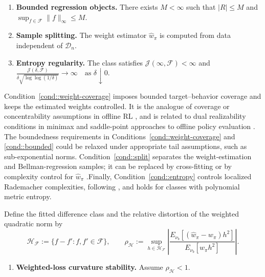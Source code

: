 \documentclass{article}
\theoremstyle{plain}
\theoremstyle{definition}
\theoremstyle{remark}
\begin{document}
\begin{enumerate}[label=\textbf{C\arabic*}, ref={C\arabic*},
leftmargin=1.5em,resume=cond]
\item \label{cond::bounded}
\textbf{Bounded regression objects.}
There exists \(M<\infty\) such that \(|R|\le M\) and
\(\sup_{f\in\mathcal F}\|f\|_{\infty}\le M\).

\item \label{cond::split}
\textbf{Sample splitting.}
The weight estimator \(\widehat w_\pi\) is computed from data independent of
\(\mathcal D_n\).


\item \label{cond::entropy}
\textbf{Entropy regularity.}
The class satisfies \(\mathcal J(\infty,\mathcal F)<\infty\) and $\frac{\mathcal J(\delta,\mathcal F)}
{\delta\sqrt{\log\log(1/\delta)}} \to \infty
\quad \text{as } \delta\downarrow0 .$
\end{enumerate}
Condition~\ref{cond::weight-coverage} imposes bounded target--behavior
coverage and keeps the estimated weights controlled. It is the analogue of
coverage or concentrability assumptions in offline RL
\citep{xie2022role}, and is related to dual realizability conditions in
minimax and saddle-point approaches to offline policy evaluation
\citep{uehara2020minimax}. The boundedness requirements in Conditions~\ref{cond::weight-coverage} and
\ref{cond::bounded} could be relaxed under appropriate tail assumptions, such
as sub-exponential norms. Condition~\ref{cond::split} separates the
weight-estimation and Bellman-regression samples; it can be replaced by
cross-fitting or by complexity control for \(\widehat w_\pi\)
\citep{foster2023orthogonal,van2026researcher}.Finally, Condition~\ref{cond::entropy} controls localized Rademacher
complexities, following \citet{munos2008finite}, and holds for classes with
polynomial metric entropy.


Define the fitted difference class and the relative distortion of the weighted
quadratic norm by
\[
\mathcal H_{\mathcal F}:=\{f-f':f,f'\in\mathcal F\},
\qquad
\rho_{\mathcal H}
:=
\sup_{h\in\mathcal H_{\mathcal F}}
\left|
\frac{E_{\nu_b}[(\widehat w_\pi-w_\pi)h^2]}
     {E_{\nu_b}[w_\pi h^2]}
\right|.
\]

\begin{enumerate}[label=\textbf{C\arabic*}, ref={C\arabic*},
leftmargin=1.5em,resume=cond]
\item \label{cond::weight-stability}
\textbf{Weighted-loss curvature stability.}
Assume \(\rho_{\mathcal H}<1\).
\end{enumerate}
\end{document}
